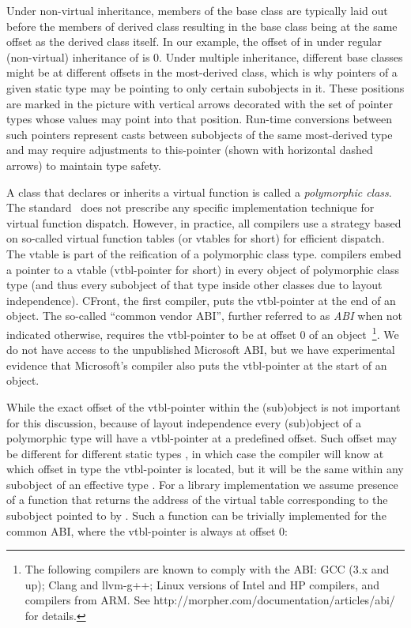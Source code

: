 Under non-virtual inheritance, members of the base class are typically laid out 
before the members of derived class resulting in the base class being at the 
same offset as the derived class itself. In our example, the offset of  
in  under regular (non-virtual) inheritance of  is 0.
Under multiple inheritance, different base classes might be at different offsets 
in the most-derived class, which is why pointers of a given static type may be 
pointing to only certain subobjects in it. These positions are marked in the 
picture with vertical arrows decorated with the set of pointer types whose 
values may point into that position. Run-time conversions between such pointers 
represent casts between subobjects of the same most-derived type and may require 
adjustments to this-pointer (shown with horizontal dashed arrows) to maintain 
type safety.

A class that declares or inherits a virtual function is called a 
\emph{polymorphic class}. The \Cpp{} standard~\cite{C++11} does not prescribe any 
specific implementation technique for virtual function dispatch.
However, in practice, all \Cpp{} compilers use a strategy based on so-called
virtual function tables (or vtables for short) for efficient dispatch. 
The vtable is part of the reification of a polymorphic class type.  
\Cpp{} compilers embed a pointer to a vtable (vtbl-pointer for short) in every object of
polymorphic class type (and thus every subobject of that type inside other 
classes due to layout independence). CFront, the first \Cpp{} compiler, puts the 
vtbl-pointer 
at the end of an object. The so-called ``common vendor \Cpp{} ABI''\cite{C++ABI}, 
further referred to as \emph{\Cpp{} ABI} when not indicated otherwise, requires the 
vtbl-pointer to be at offset 0 of an object~\footnote{The following compilers 
are known to comply with the \Cpp{} ABI: GCC (3.x and up); Clang and llvm-g++; 
Linux versions of Intel and HP compilers, and compilers from ARM. See 
http://morpher.com/documentation/articles/abi/ for details.}. We do not have 
access to the unpublished Microsoft ABI, but we have experimental evidence that 
Microsoft's \Cpp{} compiler also puts the vtbl-pointer at the start of an object.

While the exact offset of the vtbl-pointer within the (sub)object is not important 
for this discussion, because of layout independence every (sub)object of a 
polymorphic type  will have a vtbl-pointer at a predefined offset. 
Such offset may be different for different static types , in which case 
the compiler will know at which offset in type  the vtbl-pointer is 
located, but it will be the same within any subobject of an effective type 
. For a library implementation we assume presence of a function 
that returns the address of the virtual table corresponding to the subobject 
pointed to by . Such a function can be trivially implemented for the 
common \Cpp{} ABI, where the vtbl-pointer is always at offset 0:

